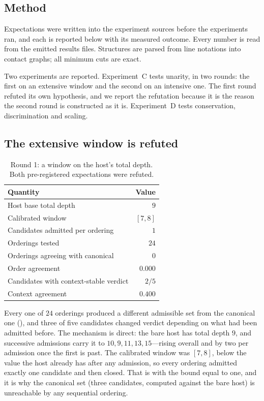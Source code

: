\documentclass[11pt,twocolumn,a4paper]{article}
\theoremstyle{upthm}
\theoremstyle{definition}
\theoremstyle{remark}
\begin{document}
\subsection{Method}

Expectations were written into the experiment sources before the
experiments ran, and each is reported below with its measured outcome.
Every number is read from the emitted results files. Structures are
parsed from line notations \citep{weininger1988} into contact graphs; all
minimum cuts are exact.

Two experiments are reported. Experiment~C tests unarity, in two rounds:
the first on an extensive window and the second on an intensive one. The
first round refuted its own hypothesis, and we report the refutation
because it is the reason the second round is constructed as it is.
Experiment~D tests conservation, discrimination and scaling.

\subsection{The extensive window is refuted}

\begin{table}[htbp]
\centering\small
\caption{Round 1: a window on the host's total depth. Both
pre-registered expectations were refuted.}
\label{tab:round1}
\begin{tabular}{@{}lr@{}}
\toprule
Quantity & Value\\
\midrule
Host base total depth & $9$\\
Calibrated window & $[7,8]$\\
Candidates admitted per ordering & $1$\\
Orderings tested & $24$\\
Orderings agreeing with canonical & $0$\\
Order agreement & $0.000$\\
Candidates with context-stable verdict & $2/5$\\
Context agreement & $0.400$\\
\bottomrule
\end{tabular}
\end{table}

Every one of $24$ orderings produced a different admissible set from the
canonical one (), and three of five candidates changed
verdict depending on what had been admitted before. The mechanism is
direct: the bare host has total depth $9$, and successive admissions
carry it to $10,9,11,13,15$---rising overall and by two per admission
once the first is past. The calibrated window was $[7,8]$, below the
value the host already has after any admission, so every ordering
admitted exactly one candidate and then closed. That is
 with the bound equal to one, and it is why
the canonical set (three candidates, computed against the bare host) is
unreachable by any sequential ordering.
\end{document}
